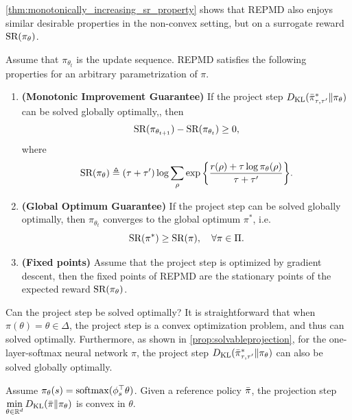 \cref{thm:monotonically_increasing_sr_property} shows that REPMD also enjoys similar desirable properties in the non-convex setting, but on a surrogate reward $\text{SR}(\pi_\theta)$.
\begin{thm}
\label{thm:monotonically_increasing_sr_property}
Assume that $\pi_{\theta_{t}}$ is the update sequence. REPMD satisfies the following properties for an arbitrary parametrization of $\pi$.
\begin{enumerate}
	\item {\bf (Monotonic Improvement Guarantee)} 
	If the project step $D_{\mathrm{KL}}( \bar{\pi}_{\tau,\tau^{\prime}}^* \| \pi_\theta )$ can be solved globally optimally,, then 
	\begin{equation*}
	\text{SR}(\pi_{\theta_{t+1}}) - \text{SR}(\pi_{\theta_t})\ge 0,
	\end{equation*}
	where
	\begin{equation}
	\label{eq:SR}
	\text{SR}(\pi_\theta) \triangleq (\tau + \tau^{\prime})\log{ \sum_{\rho}{ \exp\left\{ \frac{r(\rho) + \tau \log{\pi_\theta(\rho)} }{\tau + \tau^{\prime}} \right\} }}.
	\end{equation}
	\item  {\bf (Global Optimum Guarantee)} If the project step can be solved globally optimally, then $ \pi_{\theta_{t}}$ converges to the global optimum $\pi^*$, i.e. 
	\[
	\text{SR}(\pi^*) \ge  \text{SR}(\pi), \quad \forall \pi\in\Pi.
	\]
	\item {\bf (Fixed points)} Assume that the project step is optimized by gradient descent, then the fixed points of REPMD are the 
	stationary points of the expected reward $\text{SR}(\pi_\theta)$. 
\end{enumerate}
\end{thm}

Can the project step be solved optimally? It is straightforward that when $\pi(\theta) = \theta \in \Delta$, the project step is a convex optimization problem, and thus can solved optimally.
Furthermore, as shown in \cref{prop:solvableprojection}, 
for the one-layer-softmax neural network $\pi$, the project step $D_{\mathrm{KL}}( \bar{\pi}_{\tau,\tau^{\prime}}^* \| \pi_\theta )$ can also be solved globally optimally.
\begin{prop}
	\label{prop:solvableprojection}
	Assume $\pi_\theta(s) = \mathrm{softmax}(\phi_s^{\top}\theta)$. Given a reference policy $\bar{\pi}$, the projection step $\min\limits_{\theta \in \mathbb{R}^d}{D_{\mathrm{KL}}(\bar{\pi} \| \pi_\theta)}$ is convex in $\theta$.
\end{prop}


